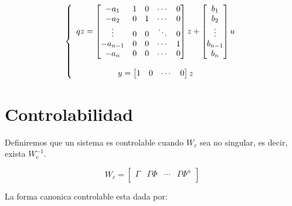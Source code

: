 \begin{equation}
    \left\{ \begin{array}{c}  
        qz = 
        \begin{bmatrix}
            -a_1 & 1 & 0 & \cdots & 0 \\ 
            -a_2 & 0 & 1 & \cdots & 0 \\
            \vdots & 0 & 0 & \ddots & 0 \\
            -a_{n-1} & 0 & 0 & \cdots & 1 \\
            -a_n & 0 & 0 & \cdots & 0 \\
        \end{bmatrix} z + 
        \begin{bmatrix}
            b_1 \\ b_2 \\ \vdots \\ b_{n-1} \\ b_n \\
        \end{bmatrix} u \\ \\
        y = 
        \begin{bmatrix}
            1 & 0 & \cdots & 0    
        \end{bmatrix} z
     \end{array} \right.
\end{equation}

\section{Controlabilidad}

Definiremos que un sistema es controlable cuando $W_c$ sea no singular, es decir, exista $W_c^{-1}$.

\begin{equation}
    W_c = 
    \begin{bmatrix}
        \Gamma & \Gamma \Phi & \cdots & \Gamma \Phi^n \\
    \end{bmatrix}
\end{equation}

La forma canonica controlable esta dada por: 

